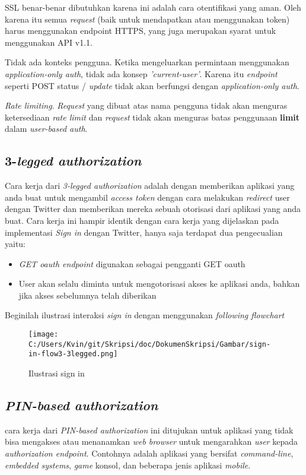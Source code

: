 SSL benar-benar dibutuhkan karena ini adalah cara otentifikasi yang aman. Oleh karena itu semua \textit{request} (baik untuk mendapatkan atau menggunakan token) harus menggunakan endpoint HTTPS, yang juga merupakan syarat untuk menggunakan API v1.1.

Tidak ada konteks pengguna. Ketika mengeluarkan permintaan menggunakan \textit{application-only auth}, tidak ada konsep \textit{'current-user'}. Karena itu \textit{endpoint} seperti POST status / \textit{update} tidak akan berfungsi dengan \textit{application-only auth}.

\textit{Rate limiting}. \textit{Request} yang dibuat atas nama pengguna tidak akan menguras ketersediaan \textit{rate limit} dan \textit{request} tidak akan menguras batas penggunaan \textbf{limit} dalam \textit{user-based auth}.


\subsection{3-\textit{legged authorization}}
Cara kerja dari \textit{3-legged authorization} adalah dengan memberikan aplikasi yang anda buat untuk mengambil \textit{access token} dengan cara melakukan \textit{redirect} user dengan Twitter dan memberikan mereka sebuah otorisasi dari aplikasi yang anda buat. Cara kerja ini hampir identik dengan cara kerja yang dijelaskan pada implementasi \textit{Sign in} dengan Twitter, hanya saja terdapat dua pengecualian yaitu:

\begin{itemize}
	\item \textit{GET oauth endpoint} digunakan sebagai pengganti GET oauth
	\item User akan selalu diminta untuk mengotorisasi akses ke aplikasi anda, bahkan jika akses sebelumnya telah diberikan
\end{itemize}

Beginilah ilustrasi interaksi \textit{sign in} dengan menggunakan \textit{following flowchart}

\begin{figure}[hp]
	\centering
		\texttt{[image: C:/Users/Kvin/git/Skripsi/doc/DokumenSkripsi/Gambar/sign-in-flow3-3legged.png]}
	\caption{Ilustrasi sign in}
	\label{fig:sign-in-flow3-3legged}
\end{figure}

\subsection{\textit{PIN-based authorization}}
cara kerja dari \textit{PIN-based authorization} ini ditujukan untuk aplikasi yang tidak bisa mengakses atau menanamkan \textit{web browser} untuk mengarahkan \textit{user} kepada \textit{authorization endpoint}. Contohnya adalah aplikasi yang bersifat \textit{command-line}, \textit{embedded systems}, \textit{game} konsol, dan beberapa jenis aplikasi \textit{mobile}.


